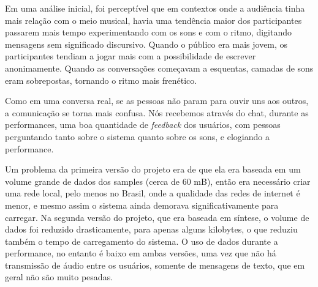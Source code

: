 Em uma análise inicial, foi perceptível que em contextos onde a audiência tinha mais relação com o meio musical, havia uma tendência maior dos participantes passarem mais tempo experimentando com os sons e com o ritmo, digitando mensagens sem significado discursivo. Quando o público era mais jovem, os participantes tendiam a jogar mais com a possibilidade de escrever anonimamente. Quando as conversações começavam a esquentas, camadas de sons eram sobrepostas, tornando o ritmo mais frenético.

Como em uma conversa real, se as pessoas não param para ouvir uns aos outros, a comunicação se torna mais confusa. Nós recebemos através do chat, durante as performances, uma boa quantidade de \emph{feedback} dos usuários, com pessoas perguntando tanto sobre o sistema quanto sobre os sons, e elogiando a performance.



Um problema da primeira versão do projeto era de que ela era baseada em um volume grande de dados dos samples (cerca de 60 mB), então era necessário criar uma rede local, pelo menos no Brasil, onde a qualidade das redes de internet é menor, e mesmo assim o sistema ainda demorava significativamente para carregar. Na segunda versão do projeto, que era baseada em síntese, o volume de dados foi reduzido drasticamente, para apenas alguns kilobytes, o que reduziu também o tempo de carregamento do sistema. O uso de dados durante a performance, no entanto é baixo em ambas versões, uma vez que não há transmissão de áudio entre os usuários, somente de mensagens de texto, que em geral não são muito pesadas. 


